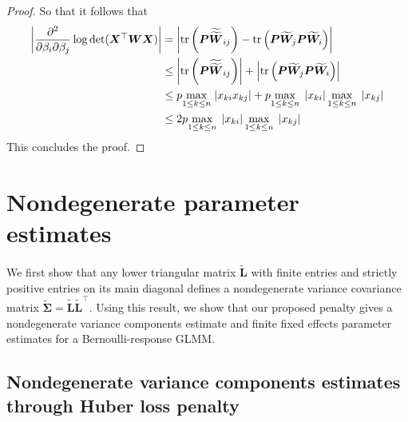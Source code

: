 \documentclass[11pt, a4paper]{article}
\newcommand*{\bb}{\boldsymbol}
\theoremstyle{example} \newtheorem{example}{Example}[section]
\theoremstyle{theorem} \newtheorem{theorem}{Theorem}[section]
\theoremstyle{theorem }\newtheorem{proposition}{Proposition}[section]
\theoremstyle{theorem }\newtheorem{corollary}{Corollary}[section]
\def\det{{\mathop{\rm det}}}
\def\\bbeta{\bb{\\bbeta}}
\def\bSigma{\bb{\Sigma}}
\def\bL{\bb{L}}
\def\bLt{\tilde{\bb{L}}}
\begin{document}
\begin{proof}
So that it follows that 
\begin{equation}
\begin{aligned}
\left|\frac{\partial^2}{\partial \beta_i \partial \beta_j} \log\det (\bb X^\top\bb W \bb X) \right|& =\left| \textrm{tr}\left(\bb P\widetilde{\widetilde{\bb W}}_{ij} \right) - \textrm{tr}\left(\bb P\widetilde{\bb W}_j \bb P\widetilde{\bb W}_i \right) \right|\\ 
&\leq \left| \textrm{tr}\left(\bb P\widetilde{\widetilde{\bb W}}_{ij} \right) \right| + \left| \textrm{tr}\left(\bb P\widetilde{\bb W}_j \bb P\widetilde{\bb W}_i \right) \right|\\ 
&\leq p\underset{1\leq k\leq n}{\max} \; |x_{ki}x_{kj}| + p\underset{1\leq k \leq n}{\max} \; \left|x_{ki}\right| \underset{1\leq k \leq n}{\max} \; \left|x_{kj}\right| \\ 
&\leq 2p\underset{1\leq k \leq n}{\max} \; \left|x_{ki}\right| \underset{1\leq k \leq n}{\max} \; \left|x_{kj}\right| \\ 
\end{aligned}
\end{equation}
This concludes the proof. 
\end{proof}	

\section{Nondegenerate parameter estimates}
\label{sec:mv_vc}

We first show that any lower triangular matrix $\tilde{\bL}$ with finite entries and strictly positive entries on its main diagonal defines a nondegenerate variance covariance matrix $\tilde{\bSigma} = \bLt \bLt^\top$. Using this result, we show that our proposed penalty gives a nondegenerate variance components estimate and finite fixed effects parameter estimates for a Bernoulli-response GLMM.  

\subsection{Nondegenerate variance components estimates through Huber loss penalty}
\end{document}
